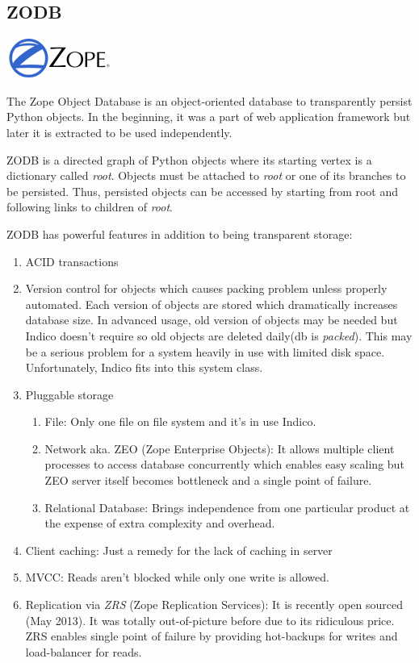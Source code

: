 \subsection{ZODB}

\vspace{-1cm} \hspace{2.9cm} \includegraphics[scale=0.6]{3/figures/zodb.png}

The Zope Object Database is an object-oriented database to transparently persist Python objects.
In the beginning, it was a part of web application framework but later it is extracted to be used independently.

ZODB is a directed graph of Python objects where its starting vertex is a dictionary called \textit{root}.
Objects must be attached to \textit{root} or one of its branches to be persisted.
Thus, persisted objects can be accessed by starting from root and following links to children of \textit{root}.

ZODB has powerful features in addition to being transparent storage:
\begin{enumerate}
  \item ACID transactions
  \item Version control for objects which causes packing problem unless properly automated. Each version of objects are stored which dramatically increases database size. In advanced usage, old version of objects may be needed but Indico doesn't require so old objects are deleted daily(db is \textit{packed}). This may be a serious problem for a system heavily in use with limited disk space. Unfortunately, Indico fits into this system class.
  \item Pluggable storage
  \begin{enumerate}
    \item File: Only one file on file system and it's in use Indico.
    \item Network aka. ZEO (Zope Enterprise Objects): It allows multiple client processes to access database concurrently which enables easy scaling but ZEO server itself becomes bottleneck and a single point of failure.
    \item Relational Database: Brings independence from one particular product at the expense of extra complexity and overhead.
  \end{enumerate}
  \item Client caching: Just a remedy for the lack of caching in server
  \item MVCC: Reads aren't blocked while only one write is allowed.
  \item Replication via \textit{ZRS} (Zope Replication Services): It is recently open sourced (May 2013). It was totally out-of-picture before due to its ridiculous price. ZRS enables single point of failure by providing hot-backups for writes and load-balancer for reads.
\end{enumerate}

